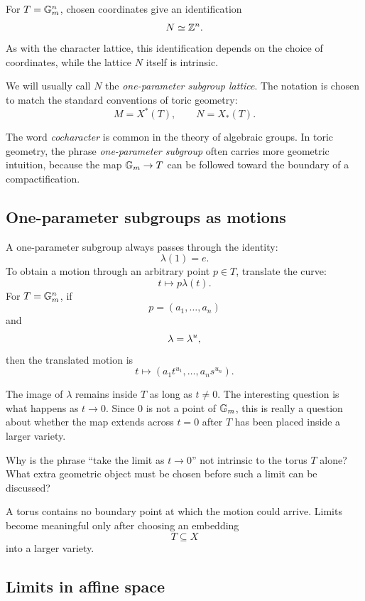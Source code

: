 For \(T=\mathbb{G}_{m}^n\), chosen coordinates give an identification
\[
N\simeq\mathbb{Z}^n.
\]
As with the character lattice, this identification depends on the
choice of coordinates, while the lattice \(N\) itself is intrinsic.

We will usually call \(N\) the \emph{one-parameter subgroup lattice}.
The notation is chosen to match the standard conventions of toric
geometry:
\[
M=X^*(T),
\qquad
N=X_*(T).
\]

\begin{observation}
The word \emph{cocharacter} is common in the theory of algebraic
groups. In toric geometry, the phrase \emph{one-parameter subgroup}
often carries more geometric intuition, because the map
\(\mathbb{G}_{m}\to T\) can be followed toward the boundary of a compactification.
\end{observation}

\subsection{One-parameter subgroups as motions}

A one-parameter subgroup always passes through the identity:
\[
\lambda(1)=e.
\]
To obtain a motion through an arbitrary point \(p\in T\), translate
the curve:
\[
t\longmapsto p\lambda(t).
\]
For \(T=\mathbb{G}_{m}^n\), if
\[
p=(a_1,\ldots,a_n)
\]
and
\[
\lambda=\lambda^{u},
\]
then the translated motion is
\[
t\longmapsto
(a_1t^{u_1},\ldots,a_ns^{u_n}).
\]

The image of \(\lambda\) remains inside \(T\) as long as \(t\neq0\).
The interesting question is what happens as \(t\to0\). Since \(0\) is
not a point of \(\mathbb{G}_{m}\), this is really a question about whether the map
extends across \(t=0\) after \(T\) has been placed inside a larger
variety.

\begin{pauseandthink}
Why is the phrase ``take the limit as \(t\to0\)'' not intrinsic to the
torus \(T\) alone? What extra geometric object must be chosen before
such a limit can be discussed?
\end{pauseandthink}

A torus contains no boundary point at which the motion could arrive.
Limits become meaningful only after choosing an embedding
\[
T\subseteq X
\]
into a larger variety.

\subsection{Limits in affine space}

